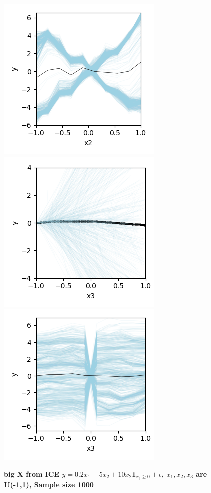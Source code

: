 \documentclass[12pt]{article}
\begin{document}
\begin{figure}[htbp]
\begin{center}
\includegraphics[scale=0.7]{images/bigx_x2_y_pdp.png}
\\
\includegraphics[scale=0.7]{images/bigx_x3_y_stratpd.png}
\includegraphics[scale=0.7]{images/bigx_x3_y_pdp.png}
\caption{{\bf  big X from ICE $y = 0.2x_1 - 5x_2 + 10x_2\mathbf{1}_{x_3 \geq 0} + \epsilon$, $x_1, x_2, x_3$ are U(-1,1), Sample size 1000}}
\label{fig:add_x1_y_stratpd}
\end{center}
\end{figure}
\end{document}
